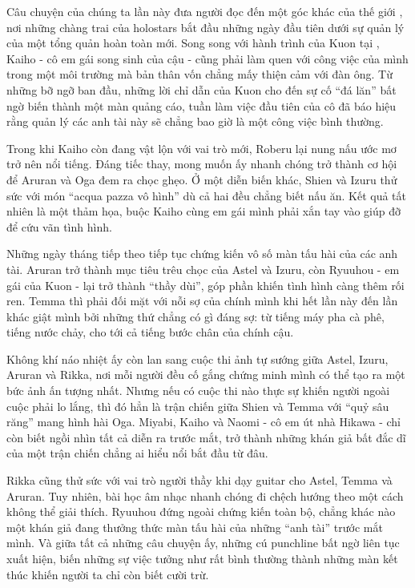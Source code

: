 \documentclass[main.tex]{subfiles}
\begin{document}
\color{black}

Câu chuyện của chúng ta lần này đưa người đọc đến một góc khác của thế giới \hll, nơi những chàng trai của holostars bắt đầu những ngày đầu tiên dưới sự quản lý của một tổng quản hoàn toàn mới. Song song với hành trình của Kuon tại \hll, Kaiho - cô em gái song sinh của cậu - cũng phải làm quen với công việc của mình trong một môi trường mà bản thân vốn chẳng mấy thiện cảm với đàn ông. Từ những bỡ ngỡ ban đầu, những lời chỉ dẫn của Kuon cho đến sự cố ``đá lăn'' bất ngờ biến thành một màn quảng cáo, tuần làm việc đầu tiên của cô đã báo hiệu rằng quản lý các anh tài này sẽ chẳng bao giờ là một công việc bình thường.

Trong khi Kaiho còn đang vật lộn với vai trò mới, Roberu lại nung nấu ước mơ trở nên nổi tiếng. Đáng tiếc thay, mong muốn ấy nhanh chóng trở thành cơ hội để Aruran và Oga đem ra chọc ghẹo. Ở một diễn biến khác, Shien và Izuru thử sức với món ``acqua pazza vô hình'' dù cả hai đều chẳng biết nấu ăn. Kết quả tất nhiên là một thảm họa, buộc Kaiho cùng em gái mình phải xắn tay vào giúp đỡ để cứu vãn tình hình.

Những ngày tháng tiếp theo tiếp tục chứng kiến vô số màn tấu hài của các anh tài. Aruran trở thành mục tiêu trêu chọc của Astel và Izuru, còn Ryuuhou - em gái của Kuon - lại trở thành ``thầy dùi'', góp phần khiến tình hình càng thêm rối ren. Temma thì phải đối mặt với nỗi sợ của chính mình khi hết lần này đến lần khác giật mình bởi những thứ chẳng có gì đáng sợ: từ tiếng máy pha cà phê, tiếng nước chảy, cho tới cả tiếng bước chân của chính cậu.

Không khí náo nhiệt ấy còn lan sang cuộc thi ảnh tự sướng giữa Astel, Izuru, Aruran và Rikka, nơi mỗi người đều cố gắng chứng minh mình có thể tạo ra một bức ảnh ấn tượng nhất. Nhưng nếu có cuộc thi nào thực sự khiến người ngoài cuộc phải lo lắng, thì đó hẳn là trận chiến giữa Shien và Temma với ``quỷ sâu răng'' mang hình hài Oga. Miyabi, Kaiho và Naomi - cô em út nhà Hikawa - chỉ còn biết ngồi nhìn tất cả diễn ra trước mắt, trở thành những khán giả bất đắc dĩ của một trận chiến chẳng ai hiểu nổi bắt đầu từ đâu.

Rikka cũng thử sức với vai trò người thầy khi dạy guitar cho Astel, Temma và Aruran. Tuy nhiên, bài học âm nhạc nhanh chóng đi chệch hướng theo một cách không thể giải thích. Ryuuhou đứng ngoài chứng kiến toàn bộ, chẳng khác nào một khán giả đang thưởng thức màn tấu hài của những ``anh tài'' trước mắt mình. Và giữa tất cả những câu chuyện ấy, những cú punchline bất ngờ liên tục xuất hiện, biến những sự việc tưởng như rất bình thường thành những màn kết thúc khiến người ta chỉ còn biết cười trừ.
\end{document}
